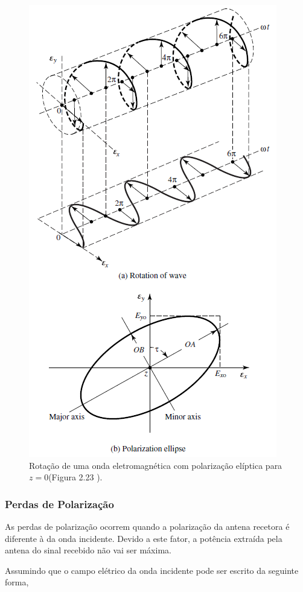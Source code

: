 \begin{figure}[h]
\centering
\includegraphics[scale=0.7]{chapters/ch3/assets/polari}
\caption[Alterações típicas da forma do diagrama de radiação]{Rotação de uma onda eletromagnética com polarização elíptica para $z=0$(Figura 2.23 \cite{Balanis2016}).}
\label{fig:polari}
\end{figure}

\subsubsection*{Perdas de Polarização}
As perdas de polarização ocorrem quando a polarização da antena recetora é diferente à da onda incidente. Devido a este fator, a potência extraída pela antena do sinal recebido não vai ser máxima.\par 
Assumindo que o campo elétrico da onda incidente pode ser escrito da seguinte forma,

